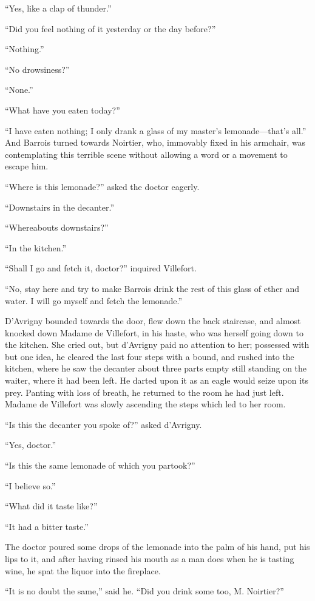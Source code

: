“Yes, like a clap of thunder.”

“Did you feel nothing of it yesterday or the day before?”

“Nothing.”

“No drowsiness?”

“None.”

“What have you eaten today?”

“I have eaten nothing; I only drank a glass of my master’s
lemonade—that’s all.” And Barrois turned towards Noirtier, who,
immovably fixed in his armchair, was contemplating this terrible scene
without allowing a word or a movement to escape him.

“Where is this lemonade?” asked the doctor eagerly.

“Downstairs in the decanter.”

“Whereabouts downstairs?”

“In the kitchen.”

“Shall I go and fetch it, doctor?” inquired Villefort.

“No, stay here and try to make Barrois drink the rest of this glass of
ether and water. I will go myself and fetch the lemonade.”

D’Avrigny bounded towards the door, flew down the back staircase, and
almost knocked down Madame de Villefort, in his haste, who was herself
going down to the kitchen. She cried out, but d’Avrigny paid no
attention to her; possessed with but one idea, he cleared the last four
steps with a bound, and rushed into the kitchen, where he saw the
decanter about three parts empty still standing on the waiter, where it
had been left. He darted upon it as an eagle would seize upon its prey.
Panting with loss of breath, he returned to the room he had just left.
Madame de Villefort was slowly ascending the steps which led to her
room.

“Is this the decanter you spoke of?” asked d’Avrigny.

“Yes, doctor.”

“Is this the same lemonade of which you partook?”

“I believe so.”

“What did it taste like?”

“It had a bitter taste.”

The doctor poured some drops of the lemonade into the palm of his hand,
put his lips to it, and after having rinsed his mouth as a man does
when he is tasting wine, he spat the liquor into the fireplace.

“It is no doubt the same,” said he. “Did you drink some too, M.
Noirtier?”

